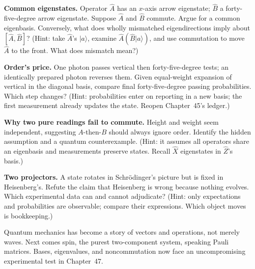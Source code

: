 \begin{puzzles}
\item \textbf{Common eigenstates.} Operator $\hat{A}$ has an $x$-axis arrow eigenstate; $\hat{B}$ a forty-five-degree arrow eigenstate. Suppose $\hat{A}$ and $\hat{B}$ commute. Argue for a common eigenbasis. Conversely, what does wholly mismatched eigendirections imply about $[\hat{A},\hat{B}]$? (Hint: take $\hat{A}$'s $|a\rangle$, examine $\hat{A}(\hat{B}|a\rangle)$, and use commutation to move $\hat{A}$ to the front. What does mismatch mean?)
\item \textbf{Order's price.} One photon passes vertical then forty-five-degree tests; an identically prepared photon reverses them. Given equal-weight expansion of vertical in the diagonal basis, compare final forty-five-degree passing probabilities. Which step changes? (Hint: probabilities enter on reporting in a new basis; the first measurement already updates the state. Reopen Chapter~45's ledger.)
\item \textbf{Why two pure readings fail to commute.} Height and weight seem independent, suggesting $A$-then-$B$ should always ignore order. Identify the hidden assumption and a quantum counterexample. (Hint: it assumes all operators share an eigenbasis and measurements preserve states. Recall $\hat{X}$ eigenstates in $\hat{Z}$'s basis.)
\item \textbf{Two projectors.} A state rotates in Schrödinger's picture but is fixed in Heisenberg's. Refute the claim that Heisenberg is wrong because nothing evolves. Which experimental data can and cannot adjudicate? (Hint: only expectations and probabilities are observable; compare their expressions. Which object moves is bookkeeping.)
\end{puzzles}

Quantum mechanics has become a story of vectors and operations, not merely waves. Next comes spin, the purest two-component system, speaking Pauli matrices. Bases, eigenvalues, and noncommutation now face an uncompromising experimental test in Chapter~47.
